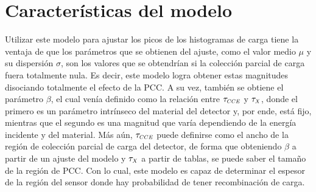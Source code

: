 \section{Características del modelo}
\noindent Utilizar este modelo para ajustar los picos de los histogramas de carga tiene la ventaja de que los parámetros que se obtienen del ajuste, como el valor medio $\mu$ y su dispersión $\sigma$, son los valores que se obtendrían si la colección parcial de carga fuera totalmente nula. Es decir, este modelo logra obtener estas magnitudes disociando totalmente el efecto de la PCC. A su vez, también se obtiene el parámetro $\beta$, el cual venía definido como la relación entre $\tau_{\scaleto{CCE}{4pt}}$ y $\tau_{\scaleto{X}{4pt}}$, donde el primero es un parámetro intrínseco del material del detector y, por ende, está fijo, mientras que el segundo es una magnitud que varía dependiendo de la energía incidente y del material. Más aún, $\tau_{\scaleto{CCE}{4pt}}$ puede definirse como el ancho de la región de colección parcial de carga del detector, de forma que obteniendo $\beta$ a partir de un ajuste del modelo y $\tau_{\scaleto{X}{4pt}}$ a partir de tablas, se puede saber el tamaño de la región de PCC. Con lo cual, este modelo es capaz de determinar el espesor de la región del sensor donde hay probabilidad de tener recombinación de carga.

